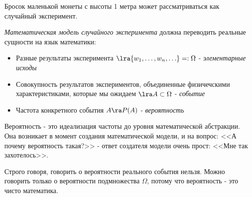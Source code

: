 \begin{example}
	Бросок маленькой монеты с высоты 1 метра может рассматриваться как случайный эксперимент.
\end{example}

\begin{note}
	\textit{Математическая модель случайного эксперимента} должна переводить реальные сущности на язык математики:
	\begin{itemize}
		\item Разные результаты эксперимента $\lra \{w_1, \ldots, w_n, \ldots\} =: \Omega$ - \textit{элементарные исходы}
		
		\item Совокупность результатов экспериментов, объединенные физичечскими характеристиками, которые мы ожидаем $\lra A \subset \Omega$ - \textit{событие}
		
		\item Частота конкретного события $A \ra P(A)$ - \textit{вероятность}
	\end{itemize}
\end{note}

\begin{note}
	Вероятность - это идеализация частоты до уровня математической абстракции. Она возникает в момент создания математической модели, и на вопрос: <<А почему вероятность такая?>> - ответ создателя модели очень прост: <<Мне так захотелось>>.
	
	Строго говоря, говорить о вероятности реального события нельзя. Можно говорить только о вероятности подмножества $\Omega$, потому что вероятность - это чисто математика.
\end{note}

